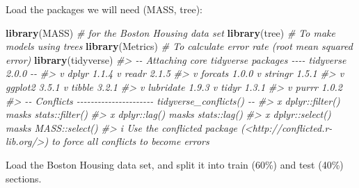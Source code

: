 \documentclass[
]{book}
\newenvironment{Shaded}{\begin{snugshade}}{\end{snugshade}}
\newcommand{\CommentTok}[1]{\textcolor[rgb]{0.56,0.35,0.01}{\textit{#1}}}
\newcommand{\FunctionTok}[1]{\textcolor[rgb]{0.13,0.29,0.53}{\textbf{#1}}}
\newcommand{\NormalTok}[1]{#1}
\begin{document}
Load the packages we will need (MASS, tree):

\begin{Shaded}
\begin{Highlighting}[]
\FunctionTok{library}\NormalTok{(MASS) }\CommentTok{\# for the Boston Housing data set}
\FunctionTok{library}\NormalTok{(tree) }\CommentTok{\# To make models using trees}
\FunctionTok{library}\NormalTok{(Metrics) }\CommentTok{\# To calculate error rate (root mean squared error)}
\FunctionTok{library}\NormalTok{(tidyverse)}
\CommentTok{\#\textgreater{} {-}{-} Attaching core tidyverse packages {-}{-}{-}{-} tidyverse 2.0.0 {-}{-}}
\CommentTok{\#\textgreater{} v dplyr     1.1.4     v readr     2.1.5}
\CommentTok{\#\textgreater{} v forcats   1.0.0     v stringr   1.5.1}
\CommentTok{\#\textgreater{} v ggplot2   3.5.1     v tibble    3.2.1}
\CommentTok{\#\textgreater{} v lubridate 1.9.3     v tidyr     1.3.1}
\CommentTok{\#\textgreater{} v purrr     1.0.2     }
\CommentTok{\#\textgreater{} {-}{-} Conflicts {-}{-}{-}{-}{-}{-}{-}{-}{-}{-}{-}{-}{-}{-}{-}{-}{-}{-}{-}{-}{-}{-} tidyverse\_conflicts() {-}{-}}
\CommentTok{\#\textgreater{} x dplyr::filter() masks stats::filter()}
\CommentTok{\#\textgreater{} x dplyr::lag()    masks stats::lag()}
\CommentTok{\#\textgreater{} x dplyr::select() masks MASS::select()}
\CommentTok{\#\textgreater{} i Use the conflicted package (\textless{}http://conflicted.r{-}lib.org/\textgreater{}) to force all conflicts to become errors}
\end{Highlighting}
\end{Shaded}

Load the Boston Housing data set, and split it into train (60\%) and test
(40\%) sections.
\end{document}
